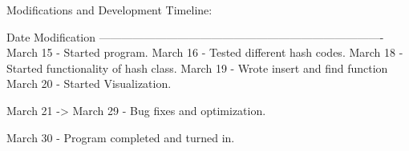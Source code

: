 \begin{DoxyParagraph}{Modifications and Development Timeline\+: }
\begin{DoxyVerb}Date          Modification 
---------------------------------------------------------------------------- 
March 15 - Started program.
March 16 - Tested different hash codes.
March 18 - Started functionality of hash class.
March 19 - Wrote insert and find function
March 20 - Started Visualization.

March 21 -> March 29 -
    Bug fixes and optimization.

March 30 - Program completed and turned in.\end{DoxyVerb}
 
\end{DoxyParagraph}
